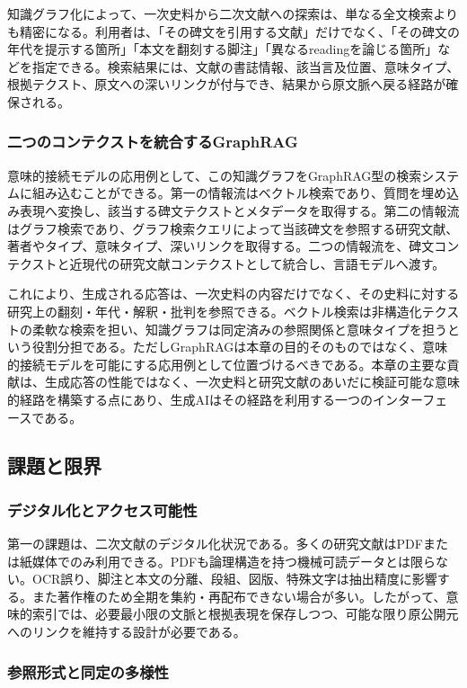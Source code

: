 知識グラフ化によって、一次史料から二次文献への探索は、単なる全文検索よりも精密になる。利用者は、「その碑文を引用する文献」だけでなく、「その碑文の年代を提示する箇所」「本文を翻刻する脚注」「異なるreadingを論じる箇所」などを指定できる。検索結果には、文献の書誌情報、該当言及位置、意味タイプ、根拠テクスト、原文への深いリンクが付与でき、結果から原文脈へ戻る経路が確保される。

\subsubsection{二つのコンテクストを統合するGraphRAG}

意味的接続モデルの応用例として、この知識グラフをGraphRAG型の検索システムに組み込むことができる。第一の情報流はベクトル検索であり、質問を埋め込み表現へ変換し、該当する碑文テクストとメタデータを取得する。第二の情報流はグラフ検索であり、グラフ検索クエリによって当該碑文を参照する研究文献、著者やタイプ、意味タイプ、深いリンクを取得する。二つの情報流を、碑文コンテクストと近現代の研究文献コンテクストとして統合し、言語モデルへ渡す。

これにより、生成される応答は、一次史料の内容だけでなく、その史料に対する研究上の翻刻・年代・解釈・批判を参照できる。ベクトル検索は非構造化テクストの柔軟な検索を担い、知識グラフは同定済みの参照関係と意味タイプを担うという役割分担である。ただしGraphRAGは本章の目的そのものではなく、意味的接続モデルを可能にする応用例として位置づけるべきである。本章の主要な貢献は、生成応答の性能ではなく、一次史料と研究文献のあいだに検証可能な意味的経路を構築する点にあり、生成AIはその経路を利用する一つのインターフェースである。

\subsection{課題と限界}

\subsubsection{デジタル化とアクセス可能性}

第一の課題は、二次文献のデジタル化状況である。多くの研究文献はPDFまたは紙媒体でのみ利用できる。PDFも論理構造を持つ機械可読データとは限らない。OCR誤り、脚注と本文の分離、段組、図版、特殊文字は抽出精度に影響する。また著作権のため全期を集約・再配布できない場合が多い。したがって、意味的索引では、必要最小限の文脈と根拠表現を保存しつつ、可能な限り原公開元へのリンクを維持する設計が必要である。

\subsubsection{参照形式と同定の多様性}

